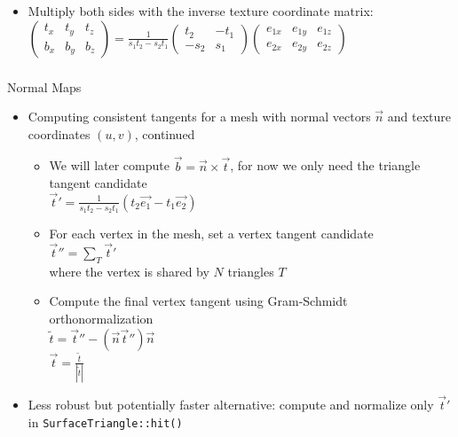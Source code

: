 \documentclass[utf8,stillsansserifmath,fleqn,t]{beamer}
\newcommand{\code}[1]{\texttt{#1}}
\newcommand{\ds}{\displaystyle}
\begin{document}
\begin{frame}
\begin{itemize}
\begin{itemize}
    \item Multiply both sides with the inverse texture coordinate matrix:\\
    $\ds \begin{pmatrix}t_x & t_y & t_z\\ b_x & b_y & b_z \end{pmatrix}
    = \frac{1}{s_1 t_2 - s_2 t_1}\begin{pmatrix}t_2 & -t_1 \\ -s_2 & s_1\end{pmatrix}
    \begin{pmatrix}e_{1x} & e_{1y} & e_{1z}\\ e_{2x} & e_{2y} & e_{2z}\end{pmatrix}$
    \end{itemize}
\end{itemize}
\end{frame}

\begin{frame}
\frametitle{\insertsection}
Normal Maps
\begin{itemize}
\item Computing consistent tangents for a mesh with normal vectors $\vec{n}$
and texture coordinates $(u,v)$, continued
    \begin{itemize}
    \item We will later compute $\vec{b}=\vec{n}\times\vec{t}$, for now we only need
    the triangle tangent candidate\\
    $\ds \vec{t}' = \frac{1}{s_1 t_2 - s_2 t_1}(t_2 \vec{e_1} - t_1 \vec{e_2})$
    \item For each vertex in the mesh, set a vertex tangent candidate\\
        $\ds \vec{t}'' = \sum_T \vec{t}'$\\
        where the vertex is shared by $N$ triangles $T$
    \item Compute the final vertex tangent using Gram-Schmidt orthonormalization\\
        $\ds \tilde{t} = \vec{t}'' - (\vec{n}\vec{t}'')\vec{n}$\\
        $\ds \vec{t} = \frac{\tilde{t}}{|\tilde{t}|}$
    \end{itemize}
\item Less robust but potentially faster alternative: compute and normalize only $\vec{t}'$ in
    \code{SurfaceTriangle::hit()}
\end{itemize}
\end{frame}
\end{document}
